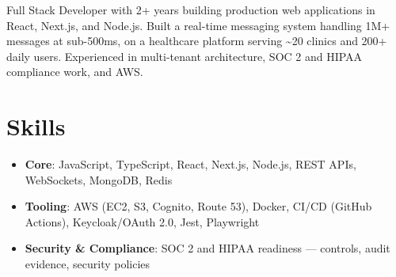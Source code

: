 \documentclass[10pt,a4paper,sans]{moderncv}
\begin{document}
\makecvtitle
\vspace{-14pt}

\small{Full Stack Developer with 2+ years building production web applications in React, Next.js, and Node.js. Built a real-time messaging system handling 1M+ messages at sub-500ms, on a healthcare platform serving \textasciitilde 20 clinics and 200+ daily users. Experienced in multi-tenant architecture, SOC 2 and HIPAA compliance work, and AWS.}

\section{Skills}
\vspace{1pt}
\begin{itemize}
\item \textbf{Core}: JavaScript, TypeScript, React, Next.js, Node.js, REST APIs, WebSockets, MongoDB, Redis
\item \textbf{Tooling}: AWS (EC2, S3, Cognito, Route 53), Docker, CI/CD (GitHub Actions), Keycloak/OAuth 2.0, Jest, Playwright
\item \textbf{Security \& Compliance}: SOC 2 and HIPAA readiness --- controls, audit evidence, security policies
\end{itemize}
\end{document}
